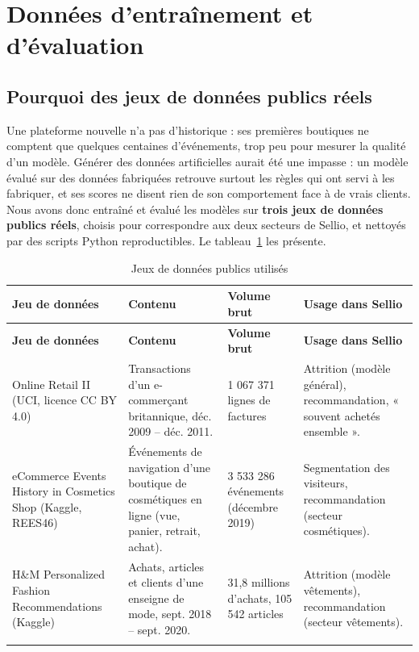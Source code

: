 \section{Données d'entraînement et d'évaluation}
\subsection{Pourquoi des jeux de données publics réels}
Une plateforme nouvelle n'a pas d'historique : ses premières boutiques ne comptent que quelques centaines d'événements, trop peu pour mesurer la qualité d'un modèle. Générer des données artificielles aurait été une impasse : un modèle évalué sur des données fabriquées retrouve surtout les règles qui ont servi à les fabriquer, et ses scores ne disent rien de son comportement face à de vrais clients. Nous avons donc entraîné et évalué les modèles sur \textbf{trois jeux de données publics réels}, choisis pour correspondre aux deux secteurs de Sellio, et nettoyés par des scripts Python reproductibles. Le tableau~\ref{tab:datasets} les présente.

\renewcommand{\arraystretch}{1.35}
\begin{longtable}{|p{3.1cm}|p{4.3cm}|p{3.4cm}|p{3.6cm}|}
\hline
\textbf{Jeu de données} & \textbf{Contenu} & \textbf{Volume brut} & \textbf{Usage dans Sellio} \\
\hline
\endfirsthead
\hline
\textbf{Jeu de données} & \textbf{Contenu} & \textbf{Volume brut} & \textbf{Usage dans Sellio} \\
\hline
\endhead
Online Retail II (UCI, licence CC BY 4.0)~\cite{onlineretail} & Transactions d'un e-commerçant britannique, déc. 2009 -- déc. 2011. & 1 067 371 lignes de factures & Attrition (modèle général), recommandation, « souvent achetés ensemble ». \\
\hline
eCommerce Events History in Cosmetics Shop (Kaggle, REES46)~\cite{cosmetics} & Événements de navigation d'une boutique de cosmétiques en ligne (vue, panier, retrait, achat). & 3 533 286 événements (décembre 2019) & Segmentation des visiteurs, recommandation (secteur cosmétiques). \\
\hline
H\&M Personalized Fashion Recommendations (Kaggle)~\cite{hm} & Achats, articles et clients d'une enseigne de mode, sept. 2018 -- sept. 2020. & 31,8 millions d'achats, 105 542 articles & Attrition (modèle vêtements), recommandation (secteur vêtements). \\
\hline
\caption{Jeux de données publics utilisés}
\label{tab:datasets}
\end{longtable}

